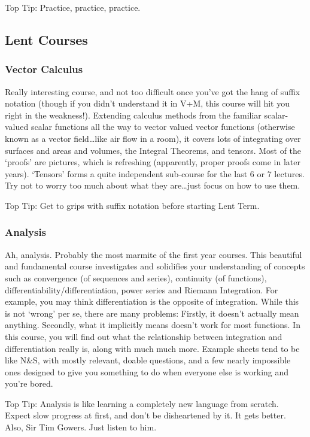 \documentclass[a4paper,11pt]{article}
\begin{document}
Top Tip: Practice, practice, practice.

\subsection{Lent Courses}

\subsubsection{Vector Calculus}
		 
Really interesting course, and not too difficult once you've got the hang of suffix notation (though if you didn't understand it in V+M, this course will hit you right in the weakness!). Extending calculus methods from the familiar scalar-valued scalar functions all the way to vector valued vector functions (otherwise known as a vector field\dots like air flow in a room), it covers lots of integrating over surfaces and areas and volumes, the Integral Theorems, and tensors. Most of the `proofs' are pictures, which is refreshing (apparently, proper proofs come in later years). `Tensors' forms a quite independent sub-course for the last 6 or 7 lectures. Try not to worry too much about what they are\dots just focus on how to use them.

Top Tip: Get to grips with suffix notation before starting Lent Term.

\subsubsection{Analysis}
	 	
Ah, analysis. Probably the most marmite of the first year courses. This beautiful and fundamental course investigates and solidifies your understanding of concepts such as convergence (of sequences and series), continuity (of functions), differentiability/differentiation, power series and Riemann Integration. For example, you may think differentiation is the opposite of integration. While this is not `wrong' per se, there are many problems: Firstly, it doesn't actually mean anything. Secondly, what it implicitly means doesn't work for most functions. In this course, you will find out what the relationship between integration and differentiation really is, along with much much more. Example sheets tend to be like N\&S, with mostly relevant, doable questions, and a few nearly impossible ones designed to give you something to do when everyone else is working and you're bored.

Top Tip: Analysis is like learning a completely new language from scratch. Expect slow progress at first, and don't be disheartened by it. It gets better. Also, Sir Tim Gowers. Just listen to him.
\end{document}
